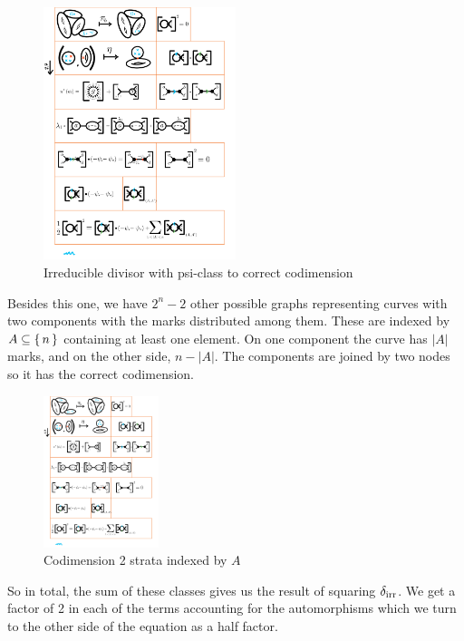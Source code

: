 \documentclass[12pt]{memoir}
\begin{document}
\begin{Ex}
     \begin{figure}[h!]
        \centering
        \includegraphics[width=0.5\textwidth, trim= 2cm 6.5cm 13.5cm 20cm,clip]{../figs/FigsDNnotability2.pdf}
        \caption{Irreducible divisor with psi-class to correct codimension}
        \label{fig:irr-squared-3}
    \end{figure}
    Besides this one, we have $2^n-2$ other possible graphs representing curves with two components with the marks distributed among them. These are indexed by $A\subseteq\{\,n\,\}$ containing at least one element. On one component the curve has $|A|$ marks, and on the other side, $n-|A|$. The components are joined by two nodes so it has the correct codimension.
     \begin{figure}[h!]
        \centering
        \includegraphics[width=0.3\textwidth, trim= 9cm 6.2cm 8.92cm 20cm,clip]{../figs/FigsDNnotability2.pdf}
        \caption{Codimension 2 strata indexed by $A$}
        \label{fig:irr-squared-4}
    \end{figure}
    So in total, the sum of these classes gives us the result of squaring $\delta_{\text{irr}}$. We get a factor of 2 in each of the terms accounting for the automorphisms which we turn to the other side of the equation as a half factor.


\end{Ex}
\end{document}
